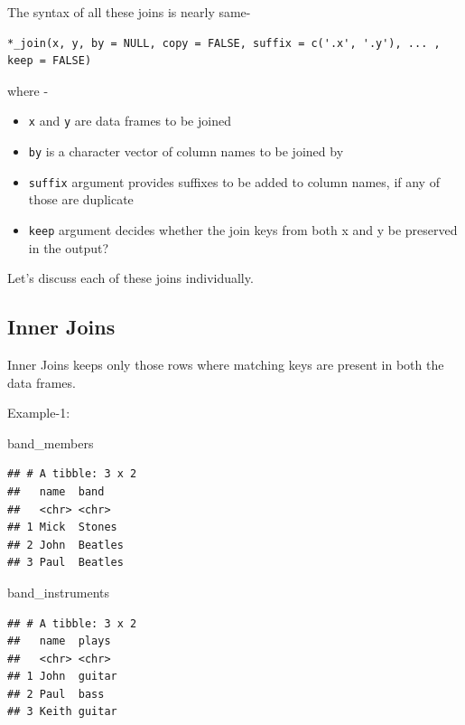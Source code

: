 \documentclass[
]{book}
\newenvironment{Shaded}{\begin{snugshade}}{\end{snugshade}}
\newcommand{\NormalTok}[1]{#1}
\providecommand{\tightlist}{%
  \setlength{\itemsep}{0pt}\setlength{\parskip}{0pt}}
\begin{document}
The syntax of all these joins is nearly same-

\begin{verbatim}
*_join(x, y, by = NULL, copy = FALSE, suffix = c('.x', '.y'), ... , keep = FALSE)
\end{verbatim}

where -

\begin{itemize}
\tightlist
\item
  \texttt{x} and \texttt{y} are data frames to be joined
\item
  \texttt{by} is a character vector of column names to be joined by
\item
  \texttt{suffix} argument provides suffixes to be added to column names, if any of those are duplicate
\item
  \texttt{keep} argument decides whether the join keys from both x and y be preserved in the output?
\end{itemize}

Let's discuss each of these joins individually.

\hypertarget{inner-joins}{%
\subsection{Inner Joins}\label{inner-joins}}

Inner Joins keeps only those rows where matching keys are present in both the data frames.

Example-1:

\begin{Shaded}
\begin{Highlighting}[]
\NormalTok{band\_members}
\end{Highlighting}
\end{Shaded}

\begin{verbatim}
## # A tibble: 3 x 2
##   name  band   
##   <chr> <chr>  
## 1 Mick  Stones 
## 2 John  Beatles
## 3 Paul  Beatles
\end{verbatim}

\begin{Shaded}
\begin{Highlighting}[]
\NormalTok{band\_instruments}
\end{Highlighting}
\end{Shaded}

\begin{verbatim}
## # A tibble: 3 x 2
##   name  plays 
##   <chr> <chr> 
## 1 John  guitar
## 2 Paul  bass  
## 3 Keith guitar
\end{verbatim}
\end{document}

